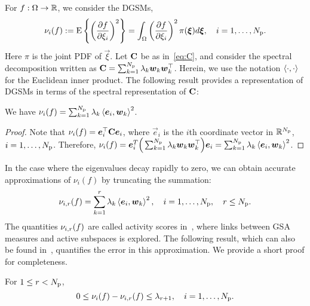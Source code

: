 For $f: \Omega \to \R$, we consider the DGSMs,
\[
    \nu_i(f) := \E{\left(\frac{\partial f}{\partial\xi_i}\right)^2} =
                  \int_\Omega 
                  \left(\frac{\partial f}{\partial\xi_i}\right)^2
                  \pi(\vec{\xi})d\vec{\xi}, \quad i = 1, \ldots, \Np.   
\]
Here $\pi$ is the joint PDF of $\vec\xi$. 
Let $\mat{C}$ be as in~\eqref{eq:C}, and consider the spectral decomposition written 
as $\mat{C} = \sum_{k=1}^\Np \lambda_k \vec{w}_k \vec{w}_k^\top$. Herein, we use the notation 
$\ip{\cdot}{\cdot}$ for the Euclidean inner product.
The following
result provides a representation of DGSMs in terms of the 
spectral representation of $\mat{C}$: 
\begin{lemma}
We have
$\nu_i(f) = \sum_{k=1}^\Np \lambda_k \ip{\vec{e}_i}{\vec{w}_k}^2$.
\end{lemma}
\begin{proof}
Note that $\nu_i(f) = \vec{e}_i^\top \mat{C} \vec{e}_i$,  
where $\vec{e}_i$ is the $i$th coordinate vector in $\R^\Np$, $i = 1, \ldots, \Np$.
Therefore,
$\nu_i(f) = \vec{e}_i^T \Big(\sum_{k=1}^\Np \lambda_k \vec{w}_k \vec{w}_k^\top\Big) \vec{e}_i
 = \sum_{k=1}^\Np \lambda_k \ip{\vec{e}_i}{\vec{w}_k}^2$. 
\end{proof}
In the case where the eigenvalues decay rapidly to zero, we can obtain
accurate approximations of $\nu_i(f)$ by truncating the summation: 
\[
   \act{f}{i}{r} =  \sum_{k=1}^r \lambda_k \ip{\vec{e}_i}{\vec{w}_k}^2,
   \quad i = 1, \ldots, \Np, \quad r \leq \Np.
\]
The quantities $\act{f}{i}{r}$ are called activity scores
in~\cite{Diaz:2016,Constantine:2017}, where links between GSA measures and
active subspaces is explored.
The following result, which
can also be found in~\cite{Diaz:2016,Constantine:2017}, quantifies the error in this
approximation. We provide a short proof for completeness. 
\begin{proposition}\label{prp:dgsm_bound} 
For $1 \leq r < \Np$,
\[
0 \leq \nu_i(f) - \act{f}{i}{r} \leq \lambda_{r+1}, \quad i = 1, \ldots, \Np.
\] 
\end{proposition}
